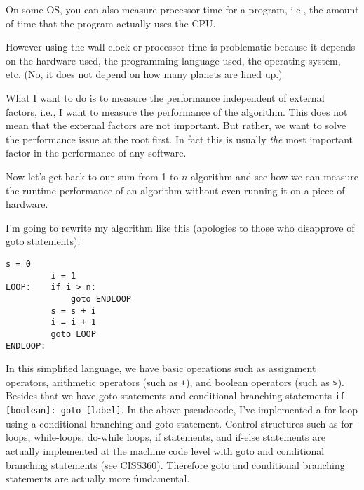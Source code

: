 On some OS, you can also measure processor time for a program, i.e.,
the amount of time that the program actually uses the CPU.

However using the wall-clock or processor time
is problematic because
it depends on the hardware used,
the programming language used,
the operating system, etc.
(No, it does not depend on how many planets are lined up.)

What I want to do is to measure the performance independent of 
external factors, i.e., I want to measure the performance of the 
algorithm.
This does not mean that the external factors are not important.
But rather, we want to solve the performance issue at the root first.
In fact this is usually \textit{the} most important factor in the 
performance of any software.

Now let's get back to our 
sum from 1 to $n$ algorithm and see how we can measure the 
runtime performance of an algorithm without even running it on a piece of
hardware.

I'm going to rewrite my algorithm like this (apologies
to those who disapprove of goto statements):
\begin{samepage}
\begin{Verbatim}[frame=single,fontsize=\footnotesize]
         s = 0                     
         i = 1                     
LOOP:    if i > n:                  
             goto ENDLOOP          
         s = s + i                 
         i = i + 1                 
         goto LOOP                 
ENDLOOP:
\end{Verbatim}
\end{samepage}
In this simplified language, we have basic operations
such as assignment operators, arithmetic operators (such as \verb!+!),
and boolean operators (such as \verb!>!).
Besides that we have goto statements and
conditional branching statements
\verb!if [boolean]: goto [label]!.
In the above pseudocode, I've implemented a for-loop using
a conditional branching and goto statement.
Control structures such as for-loops, while-loops, do-while loops,
if statements, 
and if-else statements are actually implemented at the machine code level
with goto and conditional branching statements (see CISS360).
Therefore goto and conditional branching statements are actually
more fundamental.

